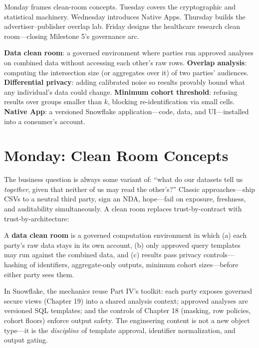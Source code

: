 Monday frames clean-room concepts. Tuesday covers the cryptographic and statistical machinery. Wednesday introduces Native Apps. Thursday builds the advertiser--publisher overlap lab. Friday designs the healthcare research clean room---closing Milestone 5's governance arc.

\begin{keyterms}
\textbf{Data clean room}: a governed environment where parties run approved analyses on combined data without accessing each other's raw rows.\quad
\textbf{Overlap analysis}: computing the intersection size (or aggregates over it) of two parties' audiences.\quad
\textbf{Differential privacy}: adding calibrated noise so results provably bound what any individual's data could change.\quad
\textbf{Minimum cohort threshold}: refusing results over groups smaller than $k$, blocking re-identification via small cells.\quad
\textbf{Native App}: a versioned Snowflake application---code, data, and UI---installed into a consumer's account.
\end{keyterms}

\section{Monday: Clean Room Concepts}
The business question is always some variant of: ``what do our datasets tell us \emph{together}, given that neither of us may read the other's?'' Classic approaches---ship CSVs to a neutral third party, sign an NDA, hope---fail on exposure, freshness, and auditability simultaneously. A clean room replaces trust-by-contract with trust-by-architecture:

\begin{definitionbox}
A \textbf{data clean room} is a governed computation environment in which (a) each party's raw data stays in its own account, (b) only approved query templates may run against the combined data, and (c) results pass privacy controls---hashing of identifiers, aggregate-only outputs, minimum cohort sizes---before either party sees them.
\end{definitionbox}

In Snowflake, the mechanics reuse Part IV's toolkit: each party exposes governed secure views (Chapter 19) into a shared analysis context; approved analyses are versioned SQL templates; and the controls of Chapter 18 (masking, row policies, cohort floors) enforce output safety. The engineering content is not a new object type---it is the \emph{discipline} of template approval, identifier normalization, and output gating.

